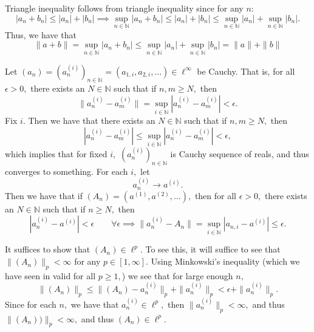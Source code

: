 \documentclass[11pt]{article}
\newcommand{\bbN}{\mathbb{N}}
\begin{document}
\begin{solution}
    Triangle inequality follows from triangle inequality since for any $n:$
    \[|a_n + b_n| \leq |a_n| + |b_n| \implies \sup_{n\in \bbN}|a_n + b_n| \leq |a_n| + |b_n| \leq \sup_{n\in \bbN}|a_n| + \sup_{n\in \bbN}|b_n|.\] Thus, we have that
    \[\|a + b\| = \sup_{n\in \bbN} |a_n + b_n| \leq \sup_{n\in \bbN}|a_n| + \sup_{n\in \bbN}|b_n| = \|a\| + \|b\|\]

    Let $(a_n) = (a_{n}^{(i)})_{n \in \bbN} = (a_{1,i}, a_{2,i}, \dots) \in \ell^\infty$ be Cauchy. That is, for all $\epsilon>0,$ there exists an $N \in \bbN$ such that if $n, m\geq N,$ then 
    \[\|a_{n}^{(i)} - a_{m}^{(i)}\| = \sup_{i \in \bbN}|a_{n}^{(i)} - a_{m}^{(i)}|< \epsilon.\] Fix $i.$ Then we have that there exists an $N \in \bbN$ such that if $n,m \geq N,$ then 
    \[|a_{n}^{(i)} - a_{m}^{(i)}| \leq \sup_{i \in \bbN}|a_{n}^{(i)} - a_{m}^{(i)}| < \epsilon,\] which implies that for fixed $i,$ $(a_{n}^{(i)})_{n\in \bbN}$ is Cauchy sequence of reals, and thus converges to something. For each $i,$ let 
    \[a_{n}^{(i)} \to a^{(i)}.\] Then we have that if $(A_n) = (a^{(1)}, a^{(2)}, \dots),$ then for all $\epsilon>0,$ there exists an $N\in \bbN$ such that if $n \geq N,$ then \[|a_{n}^{(i)} - a^{(i)}|< \epsilon \qquad \forall \epsilon \implies \|a_{n}^{(i)} - A_n\| = \sup_{i\in\bbN}|a_{n,i} - a^{(i)}| \leq \epsilon.\]

    It suffices to show that $(A_n) \in \ell^p.$ To see this, it will suffice to see that $\|(A_n)\|_p < \infty$ for any $p\in [1,\infty].$ Using Minkowski's inequality (which we have seen in valid for all $p\geq 1,$) we see that for large enough $n,$
    \[\|(A_n)\|_p \leq \|(A_n) - a_{n}^{(i)}\|_p + \|a_{n}^{(i)}\|_p < \epsilon +  \|a_{n}^{(i)}\|_p.\] Since for each $n,$ we have that $a_{n}^{(i)} \in \ell^p,$ then $\|a_{n}^{(i)}\|_p < \infty,$ and thus $\|(A_n))\|_p < \infty,$ and thus $(A_n) \in \ell^p.$
\end{solution}

\newpage
\end{document}
